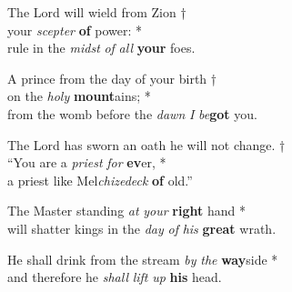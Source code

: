 The Lord will wield from Zion †\\
your \emph{scepter} \textbf{of} power: *\\
rule in the \emph{midst} \emph{of} \emph{all} \textbf{your} foes.

A prince from the day of your birth †\\
on the \emph{holy} \textbf{mount}ains; *\\
from the womb before the \emph{dawn} \emph{I} \emph{be}\textbf{got} you.

The Lord has sworn an oath he will not change. †\\
“You are a \emph{priest} \emph{for} \textbf{ev}er, *\\
a priest like Mel\emph{chizedeck} \textbf{of} old.”

The Master standing \emph{at} \emph{your} \textbf{right} hand *\\
will shatter kings in the \emph{day} \emph{of} \emph{his} \textbf{great} wrath.

He shall drink from the stream \emph{by} \emph{the} \textbf{way}side *\\
and therefore he \emph{shall} \emph{lift} \emph{up} \textbf{his} head.
